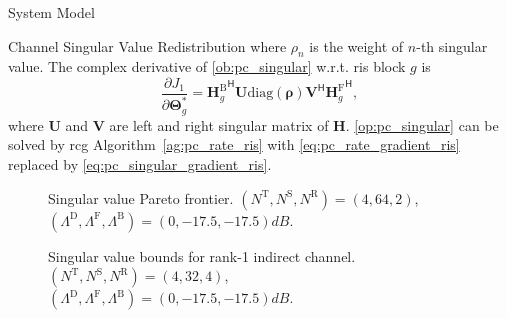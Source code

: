 \documentclass[journal]{IEEEtran}
\begin{document}
\begin{section}{System Model}
\begin{subsection}{Channel Singular Value Redistribution}
		where $\rho_n$ is the weight of $n$-th singular value.
		The complex derivative of \eqref{ob:pc_singular} w.r.t. \gls{ris} block $g$ is
		\begin{equation}
			\frac{\partial J_1}{\partial \mathbf{\Theta}_g^*} = {\mathbf{H}_g^\mathrm{B}}^\mathsf{H} \mathbf{U} \mathrm{diag}(\boldsymbol{\rho}) \mathbf{V}^\mathsf{H} {\mathbf{H}_g^\mathrm{F}}^\mathsf{H},
			\label{eq:pc_singular_gradient_ris}
		\end{equation}
		where $\mathbf{U}$ and $\mathbf{V}$ are left and right singular matrix of $\mathbf{H}$.
		\eqref{op:pc_singular} can be solved by \gls{rcg} Algorithm~\ref{ag:pc_rate_ris} with \eqref{eq:pc_rate_gradient_ris} replaced by \eqref{eq:pc_singular_gradient_ris}.

		\begin{figure}[!t]
			\centering
			\resizebox{0.65\columnwidth}{!}{
				
			}
			\caption{Singular value Pareto frontier. $(N^\mathrm{T}, N^\mathrm{S}, N^\mathrm{R}) = (4, 64, 2)$, $(\Lambda^\mathrm{D}, \Lambda^\mathrm{F}, \Lambda^\mathrm{B}) = (0, -17.5, -17.5) \unit{dB}$.}
			\label{sm:pc_singular_pareto}
		\end{figure}

		\begin{figure}[!t]
			\centering
			\resizebox{0.65\columnwidth}{!}{
				
			}
			\caption{Singular value bounds for rank-1 indirect channel. $(N^\mathrm{T}, N^\mathrm{S}, N^\mathrm{R}) = (4, 32, 4)$, $(\Lambda^\mathrm{D}, \Lambda^\mathrm{F}, \Lambda^\mathrm{B}) = (0, -17.5, -17.5) \unit{dB}$.}
			\label{sm:pc_singular_bound}
		\end{figure}


\end{subsection}
\end{section}
\end{document}
